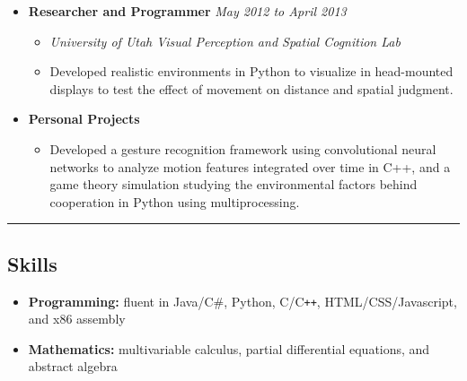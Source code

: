 \documentclass[11pt]{article}
\begin{document}
\begin{itemize}[nolistsep,topsep=0pt, label=]
\item \textbf{Researcher and Programmer} \hfill\emph{May 2012 to April 2013}
\begin{itemize}[nolistsep,topsep=0pt, label=]
\item \emph{University of Utah Visual Perception and Spatial Cognition Lab}
\item Developed realistic environments in Python to visualize in head-mounted displays to test the effect of movement on distance and spatial judgment.\end{itemize}

\item \textbf{Personal Projects}

\begin{itemize}[nolistsep,topsep=0pt, label=]
\item Developed a gesture recognition framework using convolutional neural networks to analyze motion features integrated over time in C++, and a game theory simulation studying the environmental factors behind cooperation in Python using multiprocessing. 
\end{itemize}
\end{itemize}
\vspace{0.4em}
\hrule
\vspace{-1em}
\subsection*{\textbf{Skills}}
\begin{itemize}[nolistsep,topsep=0pt, label=]
\itemsep0.33em
\item \textbf{Programming:} fluent in Java/C\#, Python, C/C{}\verb!++!, HTML/CSS/Javascript, and x86 assembly
\item \textbf{Mathematics:} multivariable calculus, partial differential equations,  and abstract algebra
\end{itemize}
\end{document}
